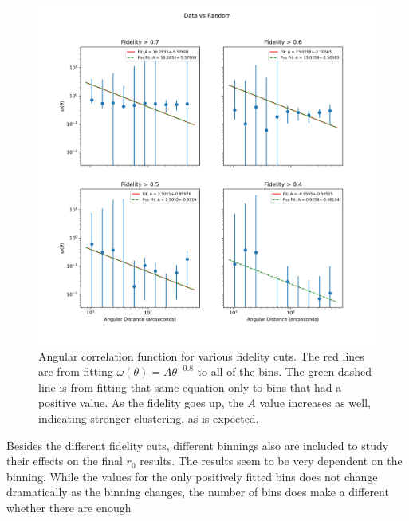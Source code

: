 \begin{figure}[tbp]
\centering \includegraphics[width=120mm]{Fidelity/Log_4Panel_Data_Vs_Random_bin10_NFalse_Num10000.png}
\caption{Angular correlation function for various fidelity cuts. The red lines are from fitting $\omega(\theta) = A\theta^{-0.8} $ to all of the bins. The green dashed line is from fitting that same equation only to bins that had a positive value. As the fidelity goes up, the $A$ value increases as well, indicating stronger clustering, as is expected.}
\label{fig:Angular_correlation}
\end{figure}

Besides the different fidelity cuts, different binnings also are included to study their effects on the final $r_0$ results. The results seem to be very dependent on the binning. While the values for the only positively fitted bins does not change dramatically as the binning changes, the number of bins does make a different whether there are enough 


